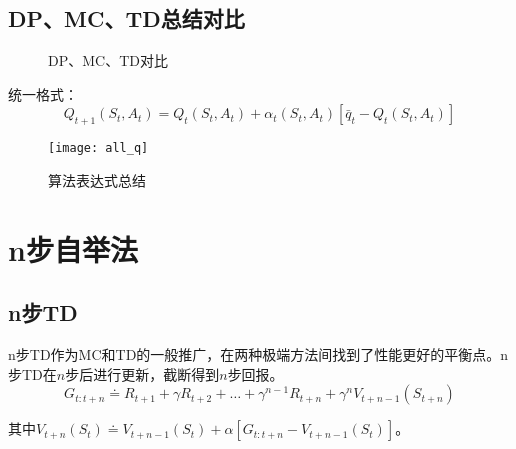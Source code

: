 \documentclass[
12pt, %
a4paper, 
oneside, %
headinclude,footinclude, %
]{scrartcl}
\begin{document}
\subsection{DP、MC、TD总结对比}
\begin{figure}[H]
\centering
{} \quad
{} \quad
{}
\caption[DP、MC、TD对比]{DP、MC、TD对比}
\end{figure}
统一格式：
$$ Q_{t + 1}(S_t, A_t) = Q_t(S_t, A_t) + \alpha_t(S_t, A_t)[\bar{q}_t - Q_t(S_t, A_t)] $$

\begin{figure}[H]
\centering
\texttt{[image: all\_q]}
\caption[算法表达式总结]{算法表达式总结}
\end{figure}
\section{n步自举法}
\subsection{n步TD}
n步TD作为MC和TD的一般推广，在两种极端方法间找到了性能更好的平衡点。n步TD在$ n $步后进行更新，截断得到$ n $步回报。
$$ G_{t:t + n} \doteq R_{t + 1} + \gamma R_{t + 2} + \dots + \gamma^{n - 1} R_{t + n} + \gamma^n V_{t + n - 1}(S_{t + n}) $$

其中$ V_{t + n}(S_t) \doteq V_{t + n - 1}(S_t) + \alpha[G_{t:t + n} - V_{t + n - 1}(S_t)] $。
\end{document}
